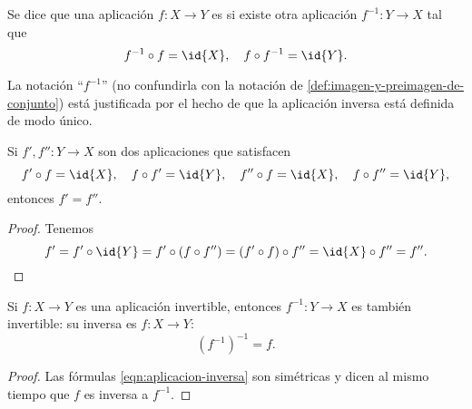 \begin{definicion}
  Se dice que una aplicación $f\colon X\to Y$ es 
   si existe otra aplicación
  $f^{-1}\colon Y\to X$ tal que
  \begin{equation}
    \label{eqn:aplicacion-inversa}
    f^{-1}\circ f = \id{X}, \quad f\circ f^{-1} = \id{Y}.
  \end{equation}
\end{definicion}

La notación ``$f^{-1}$'' (no confundirla con la notación de
\ref{def:imagen-y-preimagen-de-conjunto}) está justificada por el hecho de que
la aplicación inversa está definida de modo único.

\begin{observacion}
  Si $f', f''\colon Y\to X$ son dos aplicaciones que satisfacen
  \[ f'\circ f = \id{X}, \quad
    f\circ f' = \id{Y}, \quad
    f''\circ f = \id{X}, \quad
    f\circ f'' = \id{Y}, \]
  entonces $f' = f''$.

  \begin{proof}
    Tenemos
    \[ f' = f'\circ\id{Y} =
      f'\circ (f\circ f'') =
      (f'\circ f)\circ f'' =
      \id{X}\circ f'' = f''. \qedhere \]
  \end{proof}
\end{observacion}

\begin{observacion}
  Si $f\colon X\to Y$ es una aplicación invertible, entonces
  $f^{-1}\colon Y\to X$ es también invertible: su inversa es
  $f\colon X\to Y$:
  $$(f^{-1})^{-1} = f.$$

  \begin{proof}
    Las fórmulas \ref{eqn:aplicacion-inversa} son simétricas y dicen al mismo
    tiempo que $f$ es inversa a $f^{-1}$.
  \end{proof}
\end{observacion}

